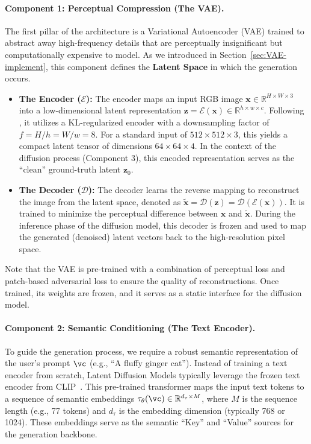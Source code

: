 \documentclass[../../book-main.tex]{subfiles}
\begin{document}
\paragraph{Component 1: Perceptual Compression (The VAE).}
The first pillar of the architecture is a Variational Autoencoder
(VAE) trained to abstract away high-frequency details that are
perceptually insignificant but computationally expensive to model. As
we introduced in Section~\ref{sec:VAE-implement}, this component
defines the \textbf{Latent Space} in which the generation occurs.
\begin{itemize}
\item \textbf{The Encoder ($\mathcal{E}$):} The encoder maps an input
    RGB image $\boldsymbol{x} \in \mathbb{R}^{H \times W \times 3}$
    into a low-dimensional latent representation $\boldsymbol{z} =
    \mathcal{E}(\boldsymbol{x}) \in \mathbb{R}^{h \times w \times
    c}$. Following \cite{rombach2022high}, it utilizes a
    KL-regularized encoder with a downsampling factor of
    $f=H/h=W/w=8$. For a standard input of $512 \times 512 \times 3$,
    this yields a compact latent tensor of dimensions $64 \times 64
    \times 4$. In the context of the diffusion process (Component 3),
    this encoded representation serves as the ``clean'' ground-truth
    latent $\boldsymbol{z}_0$.

\item \textbf{The Decoder ($\mathcal{D}$):} The decoder learns the
    reverse mapping to reconstruct the image from the latent space,
    denoted as $\tilde{\boldsymbol{x}} = \mathcal{D}(\boldsymbol{z})
    = \mathcal{D}(\mathcal{E}(\boldsymbol{x}))$. It is trained to
    minimize the perceptual difference between $\boldsymbol{x}$ and
    $\tilde{\boldsymbol{x}}$. During the inference phase of the
    diffusion model, this decoder is frozen and used to map the
    generated (denoised) latent vectors back to the high-resolution pixel space.
\end{itemize}
Note that the VAE is pre-trained with a combination of perceptual
loss and patch-based adversarial loss to ensure the quality of
reconstructions. Once trained, its weights are frozen, and it serves
as a static interface for the diffusion model.

\paragraph{Component 2: Semantic Conditioning (The Text Encoder).}
To guide the generation process, we require a robust semantic
representation of the user's prompt $\vc$ (e.g., ``A fluffy ginger
cat''). Instead of training a text encoder from scratch, Latent
Diffusion Models typically leverage the frozen text encoder from
CLIP~\citep{radford2021learning}. This pre-trained transformer maps
the input text tokens to a sequence of semantic embeddings
$\tau_\theta(\vc) \in \mathbb{R}^{d_\tau \times M}$, where $M$ is the
sequence length (e.g., 77 tokens) and $d_\tau$ is the embedding
dimension (typically 768 or 1024). These embeddings serve as the
semantic ``Key'' and ``Value'' sources for the generation backbone.
\end{document}
